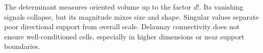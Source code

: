 The determinant measures oriented volume up to the factor $d!$. Its
vanishing signals collapse, but its magnitude mixes size and shape.
Singular values separate poor directional support from overall scale.
Delaunay connectivity does not ensure well-conditioned cells, especially
in higher dimensions or near support boundaries.
